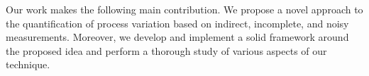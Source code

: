 Our work makes the following main contribution.
We propose a novel approach to the quantification of process variation based on indirect, incomplete, and noisy measurements.
Moreover, we develop and implement a solid framework around the proposed idea and perform a thorough study of various aspects of our technique.
